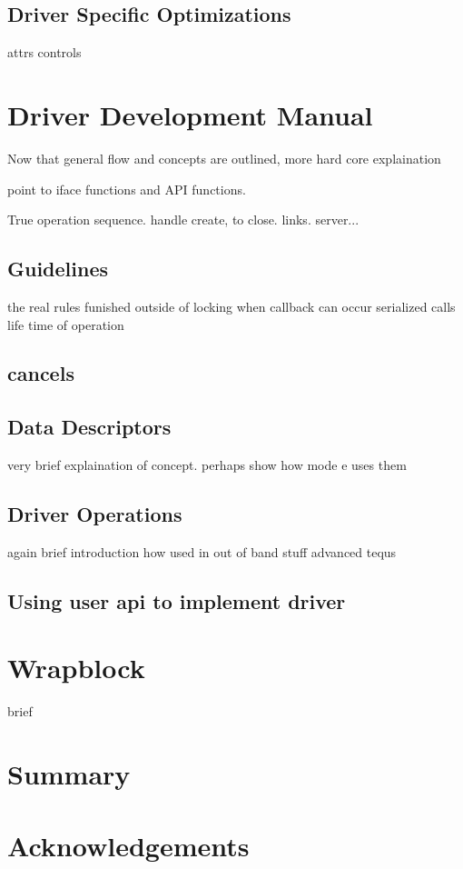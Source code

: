 \documentclass[11pt]{article}
\begin{document}
\subsection{Driver Specific Optimizations}
attrs
controls

\section{Driver Development Manual}
Now that general flow and concepts are outlined, more hard core explaination

point to iface functions and API functions.

True operation sequence.  handle create, to close.  links.  server...

\subsection{Guidelines}
the real rules
funished outside of locking
when callback can occur
serialized calls
life time of operation

\subsection{cancels}

\subsection{Data Descriptors}
very brief explaination of concept.  perhaps show how mode e uses them

\subsection{Driver Operations}
again brief introduction
how used in out of band stuff
advanced tequs

\subsection{Using user api to implement driver}

\section{Wrapblock}
brief

\section{Summary}

\section*{Acknowledgements}
\end{document}
